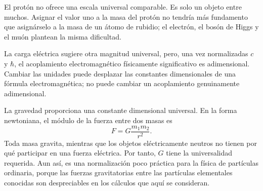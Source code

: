 El protón no ofrece una escala universal comparable. Es solo un objeto entre muchos. Asignar el valor uno a la masa del protón no tendría más fundamento que asignárselo a la masa de un átomo de rubidio; el electrón, el bosón de Higgs y el muón plantean la misma dificultad.

La carga eléctrica sugiere otra magnitud universal, pero, una vez normalizadas \(c\) y \(\hbar\), el acoplamiento electromagnético físicamente significativo es adimensional. Cambiar las unidades puede desplazar las constantes dimensionales de una fórmula electromagnética; no puede cambiar un acoplamiento genuinamente adimensional.

La gravedad proporciona una constante dimensional universal. En la forma newtoniana, el módulo de la fuerza entre dos masas es
\begin{equation}
F=G\frac{m_1m_2}{r^2}.
\end{equation}
Toda masa gravita, mientras que los objetos eléctricamente neutros no tienen por qué participar en una fuerza eléctrica. Por tanto, \(G\) tiene la universalidad requerida. Aun así, es una normalización poco práctica para la física de partículas ordinaria, porque las fuerzas gravitatorias entre las partículas elementales conocidas son despreciables en los cálculos que aquí se consideran.

\begin{classroomqa}
\end{classroomqa}

\begin{classroomqa}
\end{classroomqa}

